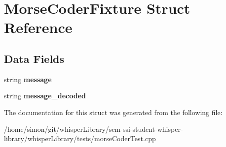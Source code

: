 \hypertarget{structMorseCoderFixture}{\section{\-Morse\-Coder\-Fixture \-Struct \-Reference}
\label{structMorseCoderFixture}
}
\subsection*{\-Data \-Fields}
\begin{DoxyCompactItemize}
\item 
\hypertarget{structMorseCoderFixture_a848d2a8a52d1ddedc73479d6eee5def8}{string {\bfseries message}}\label{structMorseCoderFixture_a848d2a8a52d1ddedc73479d6eee5def8}

\item 
\hypertarget{structMorseCoderFixture_a4f2f9955c695a0f13de5d65cc9439d6f}{string {\bfseries message\-\_\-decoded}}\label{structMorseCoderFixture_a4f2f9955c695a0f13de5d65cc9439d6f}

\end{DoxyCompactItemize}


\-The documentation for this struct was generated from the following file\-:\begin{DoxyCompactItemize}
\item 
/home/simon/git/whisper\-Library/scm-\/ssi-\/student-\/whisper-\/library/whisper\-Library/tests/morse\-Coder\-Test.\-cpp\end{DoxyCompactItemize}
